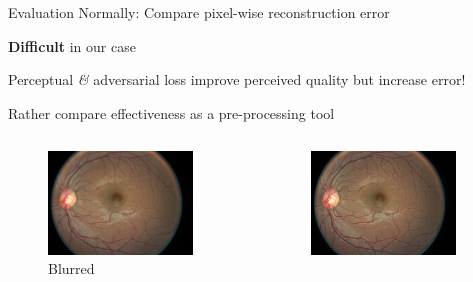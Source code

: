 \documentclass{beamer}
\begin{document}
\begin{frame}{Evaluation}
  Normally: Compare pixel-wise reconstruction error

  \textbf{Difficult} in our case

  Perceptual \textit{\&} adversarial loss improve perceived quality but increase error!

  Rather compare effectiveness as a pre-processing tool
\begin{columns}
  \begin{column}{0.33\linewidth}
    \begin{figure}[h]
      \centering
        \includegraphics[width=0.9\textwidth]{eyepacs_example_blur}
      \caption*{Blurred}
    \end{figure}
  \end{column}
  \begin{column}{0.33\linewidth}
    \begin{figure}[h]
      \centering
        \includegraphics[width=0.9\textwidth]{eyepacs_example_sharp}

\end{figure}
\end{column}
\end{columns}
\end{frame}
\end{document}
